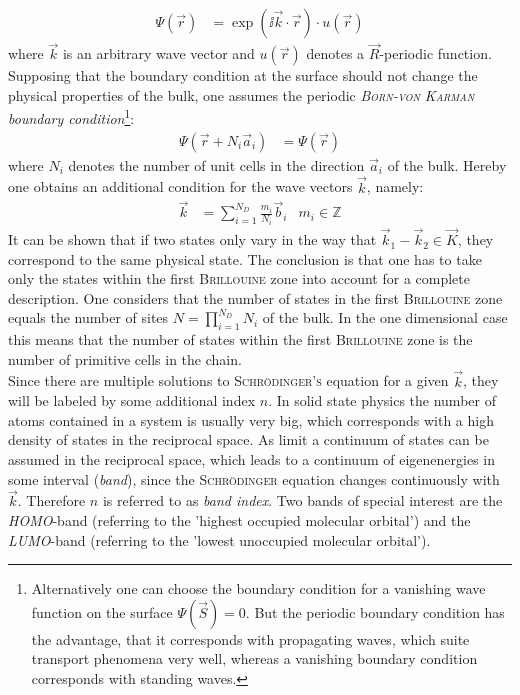\begin{align}
	\Psi(\vec{r}) &= \exp\left(\ii\vec{k}\cdot\vec{r}\right) \cdot u\left(\vec{r}\right)
\end{align}
where $\vec{k}$ is an arbitrary wave vector and $u\left(\vec{r}\right)$ denotes a $\vec{R}$-periodic function.\\
Supposing that the boundary condition at the surface should not change the physical properties of the bulk, one assumes the periodic \emph{\textsc{Born-von Karman} boundary condition}\footnote{Alternatively one can choose the boundary condition  for a vanishing wave function on the surface $\Psi\left(\vec{S}\right) = 0$. But the periodic boundary condition has the advantage, that it corresponds with propagating waves, which suite transport phenomena very well, whereas a vanishing boundary condition corresponds with standing waves.}:
\begin{align}
	\Psi\left(\vec{r} + N_i \vec{a}_i\right) &= \Psi\left(\vec{r}\right)
\end{align}
where $N_i$ denotes the number of unit cells in the direction $\vec{a}_i$ of the bulk. Hereby one obtains an additional condition for the wave vectors $\vec{k}$, namely:
\begin{align}
	\vec{k} &= \sum_{i = 1}^{N_D} \frac{m_i}{N_i} \vec{b}_i & m_i \in \mathbb{Z} 
\end{align}
It can be shown that if two states only vary in the way that $\vec{k}_1 - \vec{k}_2 \in \vec{K}$, they correspond to the same physical state. The conclusion is that one has to take only the states within the first \textsc{Brillouine} zone into account for a complete description. One considers that the number of states in the first \textsc{Brillouine} zone equals the number of sites $N = \prod_{i = 1}^{N_D}N_i$ of the bulk. In the one dimensional case this means that the number of states within the first \textsc{Brillouine} zone is the number of primitive cells in the chain.\\
Since there are multiple solutions to \textsc{Schrödinger's} equation for a given $\vec{k}$, they will be labeled by some additional index $n$. In solid state physics the number of atoms contained in a system is usually very big, which corresponds with a high density of states in the reciprocal space. As limit a continuum of states can be assumed in the reciprocal space, which leads to a continuum of eigenenergies in some interval (\emph{band}), since the \textsc{Schrödinger} equation changes continuously with $\vec{k}$. Therefore $n$ is referred to as \emph{band index}. Two bands of special interest are the \emph{HOMO}-band (referring to the 'highest occupied molecular orbital') and the \emph{LUMO}-band (referring to the 'lowest unoccupied molecular orbital').

